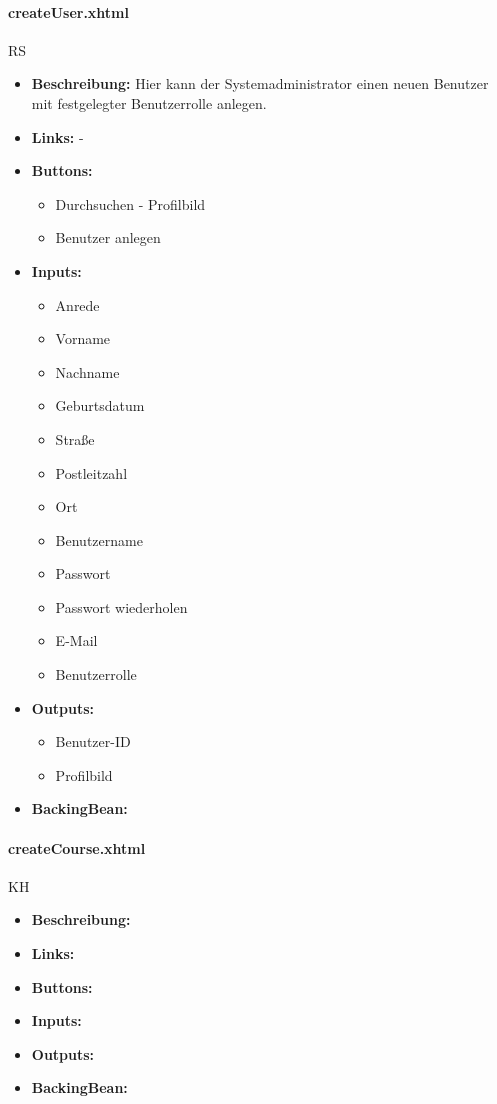 				\paragraph{createUser.xhtml}
					RS\\
					\begin{itemize}
						\item \textbf{Beschreibung:} Hier kann der Systemadministrator einen neuen Benutzer mit festgelegter Benutzerrolle anlegen.
						\item \textbf{Links:} -
						\item \textbf{Buttons:}
							\begin{itemize}
								\item Durchsuchen - Profilbild
								\item Benutzer anlegen
							\end{itemize}
						\item \textbf{Inputs:}
							\begin{itemize}
								\item Anrede
								\item Vorname
								\item Nachname
								\item Geburtsdatum
								\item Straße
								\item Postleitzahl
								\item Ort
								\item Benutzername
								\item Passwort
								\item Passwort wiederholen
								\item E-Mail
								\item Benutzerrolle
							\end{itemize}
						\item \textbf{Outputs:}
							\begin{itemize}
								\item Benutzer-ID
								\item Profilbild
							\end{itemize}
						\item \textbf{BackingBean:}
					\end{itemize}
				
				\paragraph{createCourse.xhtml}
					KH\\
					\begin{itemize}
						\item \textbf{Beschreibung:}
						\item \textbf{Links:}
						\item \textbf{Buttons:}
						\item \textbf{Inputs:}
						\item \textbf{Outputs:}
						\item \textbf{BackingBean:}
					\end{itemize}
				
